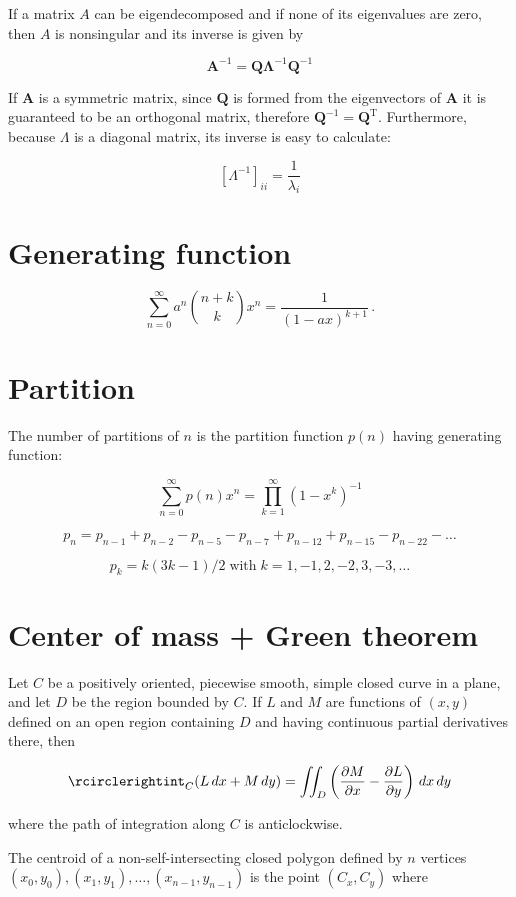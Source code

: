 \documentclass[a4paper]{article}
\begin{document}
\begin{landscape}
\begin{multicols}{2}
If a matrix $A$ can be eigendecomposed and if none of its eigenvalues are zero, then $A$ is nonsingular and its inverse is given by

$$\mathbf {A} ^{-1}=\mathbf {Q} \mathbf {\Lambda } ^{-1}\mathbf {Q} ^{-1}$$

If $\mathbf {A} $  is a symmetric matrix, since $ \mathbf {Q} $  is formed from the eigenvectors of $\mathbf {A}$  it is guaranteed to be an orthogonal matrix, therefore $\mathbf {Q} ^{-1}=\mathbf {Q} ^{\mathrm {T} }$. Furthermore, because $\Lambda$ is a diagonal matrix, its inverse is easy to calculate:

$$\left[\Lambda ^{-1}\right]_{ii}={\frac {1}{\lambda _{i}}}$$

\section{Generating function}

$$\sum _{n=0}^{\infty }a^{n}{\binom {n+k}{k}}x^{n}={\frac {1}{(1-ax)^{k+1}}}\,.$$

\section{Partition}
The number of partitions of $n$ is the partition function $p(n)$ having generating function:

$$\sum _{n=0}^{\infty }p(n)x^{n}=\prod _{k=1}^{\infty }(1-x^{k})^{-1}$$


$$p_n=p_{n - 1}+p_{n - 2}-p_{n - 5}-p_{n - 7}+p_{n - 12}+p_{n - 15}-p_{n - 22}- \dots$$

$$p_k = k(3k - 1) / 2 \;\text{with} \;k = 1, -1, 2, -2, 3, -3, \dots$$

\section{Center of mass + Green theorem}

Let $C$ be a positively oriented, piecewise smooth, simple closed curve in a plane, and let $D$ be the region bounded by $C$. If $L$ and $M$ are functions of $(x, y)$ defined on an open region containing $D$ and having continuous partial derivatives there, then

$$\rcirclerightint_{C} (L\,dx+M\,dy)=\iint _{D}\left({\frac {\partial M}{\partial x}}-{\frac {\partial L}{\partial y}}\right)\,dx\,dy$$

where the path of integration along $C$ is anticlockwise.

The centroid of a non-self-intersecting closed polygon defined by $n$ vertices $(x_0,y_0), (x_1,y_1), \dots, (x_{n-1},y_{n-1})$ is the point $(C_x, C_y)$ where


\end{multicols}
\end{landscape}
\end{document}
